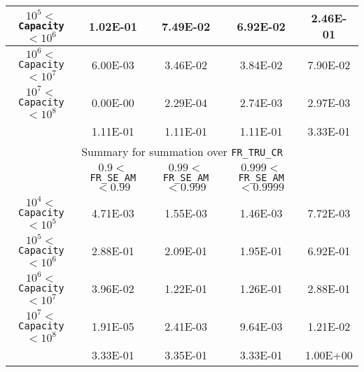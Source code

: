 \begin{center}
\begin{table}[htbp]
\begin{center}
\begin{tabular}{|c||c|c|c||c|}
\hline
$10^5 <$ \texttt{Capacity} $< 10^6$&1.02E-01&7.49E-02&6.92E-02&2.46E-01\\
\hline
$10^6 <$ \texttt{Capacity} $< 10^7$&6.00E-03&3.46E-02&3.84E-02&7.90E-02\\
\hline
$10^7 <$ \texttt{Capacity} $< 10^8$&0.00E-00&2.29E-04&2.74E-03&2.97E-03\\
\hline
&1.11E-01&1.11E-01&1.11E-01&3.33E-01\\
\hline
\hline
\multicolumn{5}{|c|}{Summary for summation over \texttt{FR\_TRU\_CR}}\\
\hline
&$0.9 <$ \texttt{FR\_SE\_AM} $< 0.99$&$0.99 <$ \texttt{FR\_SE\_AM} $< 0.999$&$0.999 <$ \texttt{FR\_SE\_AM} $< 0.9999$&\\
\hline
$10^4 <$ \texttt{Capacity} $< 10^5$&4.71E-03&1.55E-03&1.46E-03&7.72E-03\\
\hline
$10^5 <$ \texttt{Capacity} $< 10^6$&2.88E-01&2.09E-01&1.95E-01&6.92E-01\\
\hline
$10^6 <$ \texttt{Capacity} $< 10^7$&3.96E-02&1.22E-01&1.26E-01&2.88E-01\\
\hline
$10^7 <$ \texttt{Capacity} $< 10^8$&1.91E-05&2.41E-03&9.64E-03&1.21E-02\\
\hline
&3.33E-01&3.35E-01&3.33E-01&1.00E+00\\
\hline
\end{tabular}
\end{center}
\end{table}
\end{center}



